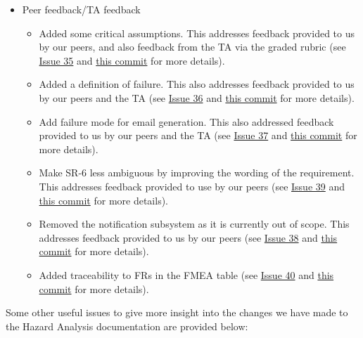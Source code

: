\documentclass{article}
\begin{document}
\begin{itemize}
    \item Peer feedback/TA feedback
          \begin{itemize}
              \item Added some critical assumptions. This addresses feedback provided to us by our peers, and also feedback from the TA via the graded rubric (see \href{https://github.com/davimang/REACH/issues/35}{Issue 35} and \href{https://github.com/davimang/REACH/commit/643f128b7c4bd9c3072f56c813d5551e18c0af4e}{this commit} for more details).
              \item Added a definition of failure. This also addresses feedback provided to us by our peers and the TA (see \href{https://github.com/davimang/REACH/issues/36}{Issue 36} and \href{https://github.com/davimang/REACH/commit/3909aa4b28693cec5cc4ef3a9d7b84c41a6ffb24}{this commit} for more details).
              \item Add failure mode for email generation. This also addressed feedback provided to us by our peers and the TA (see \href{https://github.com/davimang/REACH/issues/36}{Issue 37} and \href{https://github.com/davimang/REACH/commit/e39f11a5c2fe7af0b6e261a353f818e2780ac43d}{this commit} for more details).
              \item Make SR-6 less ambiguous by improving the wording of the requirement. This addresses feedback provided to use by our peers (see \href{https://github.com/davimang/REACH/issues/39}{Issue 39} and \href{https://github.com/davimang/REACH/commit/bb0701657d9f217275ee0027e30f728f8924e277}{this commit} for more details).
              \item Removed the notification subsystem as it is currently out of scope. This addresses feedback provided to us by our peers (see \href{https://github.com/davimang/REACH/issues/38}{Issue 38} and \href{https://github.com/davimang/REACH/commit/605e299034c55c6f3bf19bac1514fdb3b63c489e}{this commit} for more details).
              \item Added traceability to FRs in the FMEA table (see \href{https://github.com/davimang/REACH/issues/40}{Issue 40} and \href{https://github.com/davimang/REACH/commit/7969438165b2ca71af4ee2ec926f6ef81b3a9c1b}{this commit} for more details).
          \end{itemize}
\end{itemize}

Some other useful issues to give more insight into the changes we have made to the Hazard Analysis documentation are provided below:
\end{document}
